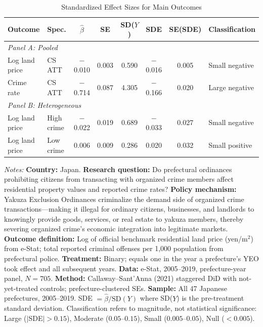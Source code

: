 \begin{table}[H]
\centering
\caption{Standardized Effect Sizes for Main Outcomes}
\label{tab:sde}
\small
\begin{tabular}{llcccccl}
\toprule
Outcome & Spec. & $\hat{\beta}$ & SE & SD($Y$) & SDE & SE(SDE) & Classification \\
\midrule
\multicolumn{8}{l}{\textit{Panel A: Pooled}} \\
Log land price & CS ATT & $-$0.010 & 0.003 & 0.590 & $-$0.016 & 0.005 & Small negative \\
Crime rate & CS ATT & $-$0.714 & 0.087 & 4.305 & $-$0.166 & 0.020 & Large negative \\
\midrule
\multicolumn{8}{l}{\textit{Panel B: Heterogeneous}} \\
Log land price & High crime & $-$0.022 & 0.019 & 0.689 & $-$0.033 & 0.027 & Small negative \\
Log land price & Low crime & 0.006 & 0.009 & 0.286 & 0.020 & 0.032 & Small positive \\
\bottomrule
\end{tabular}

\vspace{0.5em}
\begin{minipage}{\textwidth}
\footnotesize
\textit{Notes:}
\textbf{Country:} Japan.
\textbf{Research question:} Do prefectural ordinances prohibiting citizens from transacting with organized crime members affect residential property values and reported crime rates?
\textbf{Policy mechanism:} Yakuza Exclusion Ordinances criminalize the demand side of organized crime transactions---making it illegal for ordinary citizens, businesses, and landlords to knowingly provide goods, services, or real estate to yakuza members, thereby severing organized crime's economic integration into legitimate markets.
\textbf{Outcome definition:} Log of official benchmark residential land price (yen/m$^2$) from e-Stat; total reported criminal offenses per 1,000 population from prefectural police.
\textbf{Treatment:} Binary; equals one in the year a prefecture's YEO took effect and all subsequent years.
\textbf{Data:} e-Stat, 2005--2019, prefecture-year panel, $N = 705$.
\textbf{Method:} Callaway--Sant'Anna (2021) staggered DiD with not-yet-treated controls; prefecture-clustered SEs.
\textbf{Sample:} All 47 Japanese prefectures, 2005--2019.
SDE $= \hat{\beta} / \text{SD}(Y)$ where SD($Y$) is the pre-treatment standard deviation.
Classification refers to magnitude, not statistical significance:
Large ($|$SDE$| > 0.15$), Moderate ($0.05$--$0.15$), Small ($0.005$--$0.05$), Null ($< 0.005$).
\end{minipage}
\end{table}
